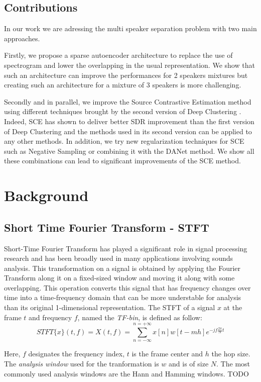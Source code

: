 \documentclass[master,final,11pt]{iscs-thesis}
\begin{document}
\section{Contributions}


In our work we are adressing the multi speaker separation problem with two main approaches. 

Firstly, we propose a sparse autoencoder architecture to replace the use of spectrogram and lower the overlapping in the usual representation. We show that such an architecture can improve the performances for 2 speakers mixtures but creating such an architecture for a mixture of 3 speakers is more challenging.

Secondly and in parallel, we improve the Source Contrastive Estimation method using different techniques brought by the second version of Deep Clustering \cite{DPCLV2}. Indeed, SCE has shown to deliver better SDR improvement than the first version of Deep Clustering \cite{DPCLV1} and the methods used in its second version can be applied to any other methods. In addition, we try new regularization techniques for SCE such as Negative Sampling or combining it with the DANet method. We show all these combinations can lead to significant improvements of the SCE method.

\chapter{Background}
\section{Short Time Fourier Transform - STFT}

Short-Time Fourier Transform has played a significant role in signal processing research and has been broadly used in many applications involving sounds analysis.
This transformation on a signal is obtained by applying the Fourier Transform along it on a fixed-sized window and moving it along with some overlapping. This operation converts this signal that has frequency changes over time into a time-frequency domain that can be more understable for analysis than its original 1-dimensional representation.
The STFT of a signal $x$ at the frame $t$ and frequency $f$, named the \textit{TF-bin}, is defined as follow:
\[
	STFT\{x\}(t,f) = X(t,f) = \sum_{n=-\infty}^{n=+\infty}x[n]w[t-mh]e^{-jf\frac{2\pi}{N}t }
\]

Here, $f$ designates the frequency index, $t$ is the frame center and $h$ the hop size. The \textit{analysis window} used for the tranformation is $w$ and is of size $N$. The most commonly used analysis windows are the Hann and Hamming windows. TODO
\end{document}

